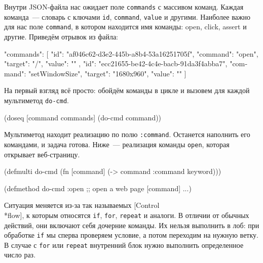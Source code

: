Внутри JSON-файла нас ожидает поле \verb|commands| с массивом команд. Каждая
команда~--- словарь с ключами \verb|id|, \verb|command|, \verb|value| и
другими. Наиболее важно для нас поле \verb|command|, в котором находится имя
команды: open, click, assert и другие. Приведём отрывок из файла:

\begin{english}
  \begin{json}
"commands": [{
  "id": "af046c62-d3e2-445b-a8b4-53a16251705f",
  "command": "open",
  "target": "/",
  "value": ""
}, {
  "id": "ecc21655-be42-4c4e-bacb-91da3f4abba7",
  "command": "setWindowSize",
  "target": "1680x960",
  "value": ""
}]
  \end{json}
\end{english}


На первый взгляд всё просто: обойдём команды в цикле и вызовем для каждой
мультиметод \verb|do-cmd|.

\begin{english}
  \begin{clojure}
(doseq [command commands]
  (do-cmd command))
  \end{clojure}
\end{english}

Мультиметод находит реализацию по полю \verb|:command|. Останется наполнить его
командами, и задача готова. Ниже~--- реализация команды \verb|open|, которая
открывает веб-страницу.

\begin{english}
  \begin{clojure}
(defmulti do-cmd
  (fn [command]
    (-> command :command keyword)))

(defmethod do-cmd :open
  ;; open a web page
  [command]
  ...)
  \end{clojure}
\end{english}

Ситуация меняется из-за так называемых
[Control\\*flow],
к которым относятся \verb|if|, \verb|for|, \verb|repeat| и аналоги. В отличии от
обычных действий, они включают себя дочерние команды. Их нельзя выполнить в лоб:
при обработке \verb|if| мы сперва проверяем условие, а потом переходим на нужную
ветку. В случае с \verb|for| или \verb|repeat| внутренний блок нужно выполнить
определенное число раз.


